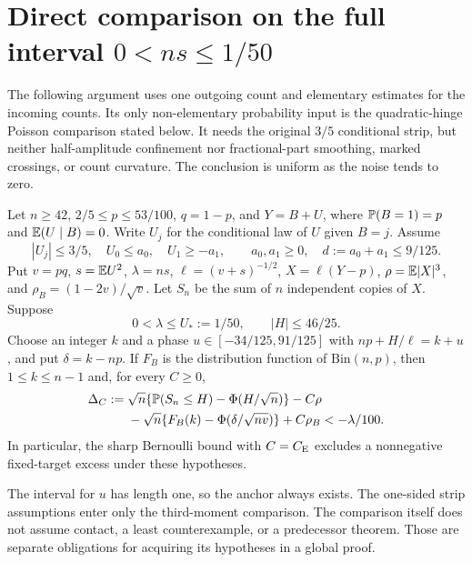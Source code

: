 \section{Direct comparison on the full interval \texorpdfstring{$0<ns\le1/50$}{0 < ns <= 1/50}}
\label{v10:moderate}

The following argument uses one outgoing count and elementary estimates for
the incoming counts. Its only non-elementary probability input is the
quadratic-hinge Poisson comparison stated below. It needs the original
$3/5$ conditional strip, but neither half-amplitude confinement nor
fractional-part smoothing, marked crossings, or count curvature. The
conclusion is uniform as the noise tends to zero.

\begin{theorem}\label{v10:moderate:theorem}
Let $n\ge42$, $2/5\le p\le53/100$, $q=1-p$, and $Y=B+U$, where
$\mathbb P(B=1)=p$ and $\mathbb E(U\mid B)=0$. Write $U_j$ for the conditional law
of $U$ given $B=j$. Assume
\[
 |U_j|\le3/5,\quad U_0\le a_0,\quad U_1\ge-a_1,
 \qquad a_0,a_1\ge0,\quad d:=a_0+a_1\le9/125.
\]
Put $v=pq$, $s=\mathbb E U^2$, $\lambda=ns$, $\ell=(v+s)^{-1/2}$,
$X=\ell(Y-p)$, $\rho=\mathbb E|X|^3$, and $\rho_B=(1-2v)/\sqrt v$.
Let $S_n$ be the sum of $n$ independent copies of $X$. Suppose
\[
             0<\lambda\le U_*:=1/50,\qquad |H|\le46/25.
\]
Choose an integer $k$ and a phase $u\in[-34/125,91/125]$ with
$np+H/\ell=k+u$, and put $\delta=k-np$.
If $F_B$ is the distribution function of $\mathrm{Bin}(n,p)$, then
$1\le k\le n-1$ and, for every $C\ge0$,
\begin{align*}
 \Delta_C:={}&\sqrt n\{\mathbb P(S_n\le H)-\Phi(H/\sqrt n)\}-C\rho\\
 &-\sqrt n\{F_B(k)-\Phi(\delta/\sqrt{nv})\}+C\rho_B
                         <-\lambda/100.
\end{align*}
In particular, the sharp Bernoulli bound with $C=C_{\mathrm E}$ excludes a
nonnegative fixed-target excess under these hypotheses.
\end{theorem}

The interval for $u$ has length one, so the anchor always exists. The
one-sided strip assumptions enter only the third-moment comparison.
The comparison itself does not assume contact, a least counterexample,
or a predecessor theorem. Those are separate obligations for acquiring
its hypotheses in a global proof.


